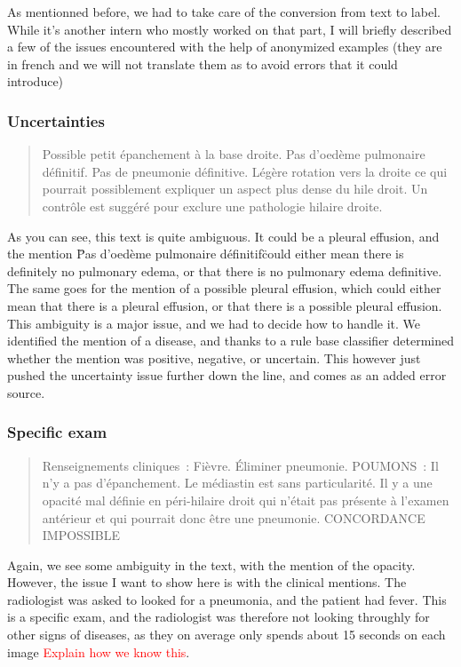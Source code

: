 \documentclass[11pt]{article}
\newcommand\myworries[1]{\textcolor{red}{#1}}
\begin{document}
    As mentionned before, we had to take care of the conversion from text to label. While it's another intern who mostly worked on that part, I will
    briefly described a few of the issues encountered with the help of anonymized examples (they are in french and we will not translate them as to avoid errors that it could introduce)

    \subsubsection{Uncertainties}

    \begin{quote}
        Possible petit épanchement à la base droite. Pas d'oedème pulmonaire définitif. Pas de pneumonie définitive. Légère rotation vers la droite ce qui pourrait possiblement expliquer un aspect plus dense du hile droit.
        Un contrôle est suggéré pour exclure une pathologie hilaire droite.
    \end{quote}
        As you can see, this text is quite ambiguous. It could be a pleural effusion, and the mention \"Pas d'oedème pulmonaire définitif\"  could either
        mean there is definitely no pulmonary edema, or that there is no pulmonary edema definitive. The same goes for the mention of a possible pleural effusion,
        which could either mean that there is a pleural effusion, or that there is a possible pleural effusion. This ambiguity is a major issue, and we had to decide how to handle it.
        We identified the mention of a disease, and thanks to a rule base classifier determined whether the mention was positive, negative, or uncertain. This however just pushed the uncertainty issue further down
        the line, and comes as an added error source.


    \subsubsection{Specific exam}
        \begin{quote}
            Renseignements cliniques : Fièvre. Éliminer pneumonie.
            POUMONS :
            Il n'y a pas d'épanchement. Le médiastin est sans particularité. Il y a une opacité mal définie en péri-hilaire droit qui n'était pas présente à l'examen antérieur et qui pourrait donc être une pneumonie.
            CONCORDANCE IMPOSSIBLE
        \end{quote}

        Again, we see some ambiguity in the text, with the mention of the opacity.  However, the issue I want to show here is with the clinical mentions. The radiologist was asked to looked for a pneumonia, and the patient had fever.
        This is  a specific exam, and the radiologist was therefore not looking throughly for other signs of diseases, as they on average only spends about 15 seconds on each image \myworries{Explain how we know this}.
\end{document}
